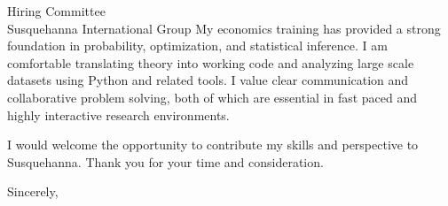 \documentclass[11pt]{letter}
\begin{document}
\begin{letter}{Hiring Committee \\ Susquehanna International Group}
My economics training has provided a strong foundation in probability, optimization, and statistical inference. I am comfortable translating theory into working code and analyzing large scale datasets using Python and related tools. I value clear communication and collaborative problem solving, both of which are essential in fast paced and highly interactive research environments.

I would welcome the opportunity to contribute my skills and perspective to Susquehanna. Thank you for your time and consideration.

\closing{Sincerely,}

\end{letter}
\end{document}
